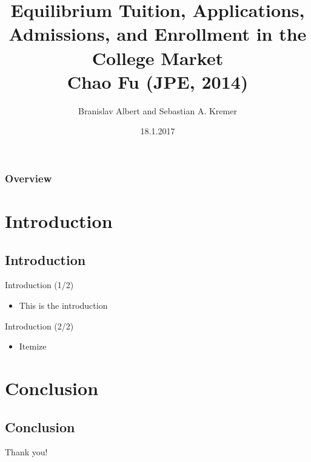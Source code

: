 \documentclass{beamer}
\title[Fu (2014)]{Equilibrium Tuition, Applications, Admissions, and Enrollment in the College Market\\
	Chao Fu (JPE, 2014)}
\author{Branislav Albert and Sebastian A. Kremer}
\date{18.1.2017}
\begin{document}
\begin{frame}
  \titlepage
\end{frame}

\begin{frame}
\frametitle{Overview}
\tableofcontents
\end{frame}


\section{Introduction}
\subsection*{Introduction}

\begin{frame}{Introduction (1/2)} %
\begin{itemize}
  \item This is the introduction
\end{itemize}
\end{frame}

\begin{frame}{Introduction (2/2)} %
\begin{itemize}
  \item Itemize
\end{itemize}
\end{frame}


\section{Conclusion}
\subsection*{Conclusion}

\begin{frame}
\Huge{\centerline{Thank you!}}
\end{frame}


\end{document}
